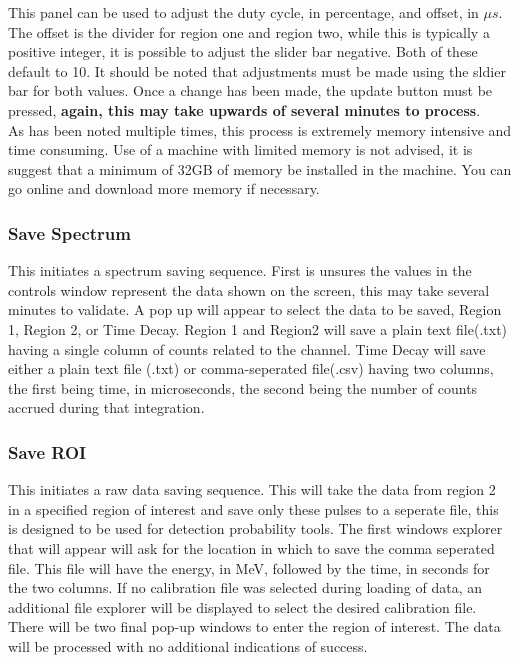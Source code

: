 This panel can be used to adjust the duty cycle, in percentage, and offset, in $\mu s$. The offset is the divider for region one and region two, while this is typically a positive integer, it is possible to adjust the slider bar negative. Both of these default to 10. It should be noted that adjustments must be made using the sldier bar for both values. Once a change has been made, the update button must be pressed, \textbf{again, this may take upwards of several minutes to process}. \\

As has been noted multiple times, this process is extremely memory intensive and time consuming. Use of a machine with limited memory is not advised, it is suggest that a minimum of 32GB of memory be installed in the machine. You can go online and download more memory if necessary.

\subsubsection{Save Spectrum}
This initiates a spectrum saving sequence. First is unsures the values in the controls window represent the data shown on the screen, this may take several minutes to validate. A pop up will appear to select the data to be saved, Region 1, Region 2, or Time Decay. Region 1 and Region2 will save a plain text file(.txt) having a single column of counts related to the channel. Time Decay will save either a plain text file (.txt) or comma-seperated file(.csv) having two columns, the first being time, in microseconds, the second being the number of counts accrued during that integration.
\subsubsection{Save ROI}
This initiates a raw data saving sequence. This will take the data from region 2 in a specified region of interest and save only these pulses to a seperate file, this is designed to be used for detection probability tools. The first windows explorer that will appear will ask for the location in which to save the comma seperated file. This file will have the energy, in MeV, followed by the time, in seconds for the two columns. If no calibration file was selected during loading of data, an additional file explorer will be displayed to select the desired calibration file. There will be two final pop-up windows to enter the region of interest. The data will be processed with no additional indications of success.

